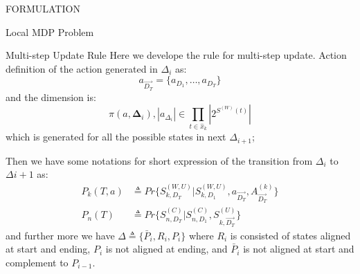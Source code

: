 \documentclass[10pt, conference, letterpaper]{IEEEtran}
\begin{document}
\begin{section}{FORMULATION}
\begin{subsection}{Local MDP Problem}
\begin{subsubsection}{Multi-step Update Rule}
                Here we develope the rule for multi-step update.
                Action definition of the action generated in $\Delta_{i}$ as:
                $$
                a_{\vec{D_T}} = \{ a_{D_1}, \dots, a_{D_T} \}
                $$
                and the dimension is:
                $$
                \pi(a, \mathbf{\Delta}_i), |a_{\Delta_i}| \in \prod_{t \in \hat{x}_k} |2^{S^{(W)}(t)}|
                $$
                which is generated for all the possible states in next $\Delta_{i+1}$;

                Then we have some notations for short expression of the transition from $\Delta_{i}$ to $\Delta{i+1}$ as:
                \begin{align}
                    P_k(T,a) &\triangleq Pr\{ S^{(W,U)}_{k,D_T}|S^{(W,U)}_{k,D_1}, a_{\vec{D_T}},A^{(k)}_{\vec{D_T} }\}
                    \\
                    P_n(T) &\triangleq Pr\{ S^{(C)}_{n,D_T}|S^{(C)}_{n,D_1}, S^{(U)}_{k,\vec{D_T}} \}
                \end{align}
                and further more we have $\Delta \triangleq \{ \bar{P}_i, R_i, P_i \}$ where $R_i$ is consisted of states aligned at start and ending, $P_i$ is not aligned at ending, and $\bar{P}_i$ is not aligned at start and complement to $P_{i-1}$.


\end{subsubsection}
\end{subsection}
\end{section}
\end{document}
